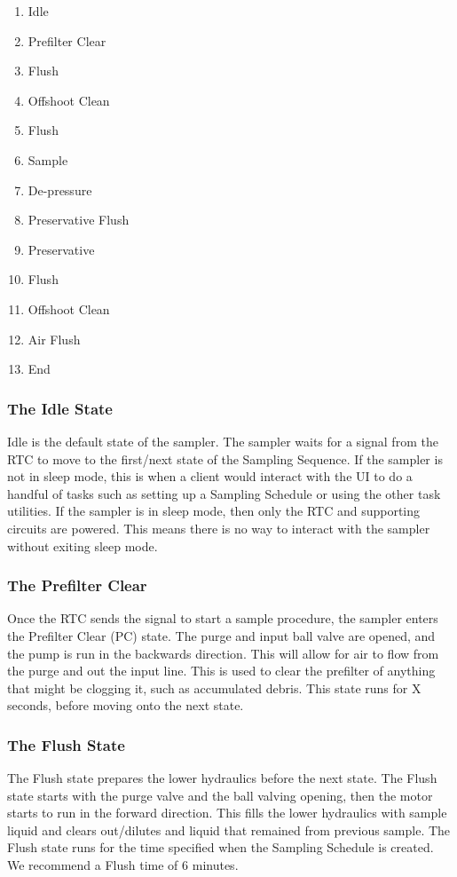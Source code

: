\documentclass[11pt, letterpaper]{article}
\begin{document}
\begin{enumerate}
	\item Idle
	\item Prefilter Clear
	\item Flush
	\item Offshoot Clean
	\item Flush
	\item Sample
	\item De-pressure
	\item Preservative Flush
	\item Preservative
	\item Flush
	\item Offshoot Clean
	\item Air Flush
	\item End
\end{enumerate}	%


\subsubsection{The Idle State}
Idle is the default state of the sampler. The sampler waits for a signal from the RTC to move to the first/next state of the Sampling Sequence. If the sampler is not in sleep mode, this is when a client would interact with the UI to do a handful of tasks such as setting up a Sampling Schedule or using the other task utilities. If the sampler is in sleep mode, then only the RTC and supporting circuits are powered. This means there is no way to interact with the sampler without exiting sleep mode.

\subsubsection{The Prefilter Clear}
Once the RTC sends the signal to start a sample procedure, the sampler enters the Prefilter Clear (PC) state. The purge and input ball valve are opened, and the pump is run in the backwards direction. This will allow for air to flow from the purge and out the input line. This is used to clear the prefilter of anything that might be clogging it, such as accumulated debris. This state runs for X seconds, before moving onto the next state. 

\subsubsection{The Flush State}
The Flush state prepares the lower hydraulics before the next state. The Flush state starts with the purge valve and the ball valving opening, then the motor starts to run in the forward direction. This fills the lower hydraulics with sample liquid and clears out/dilutes and liquid that remained from previous sample. The Flush state runs for the time specified when the Sampling Schedule is created. We recommend a Flush time of 6 minutes. 
\end{document}
